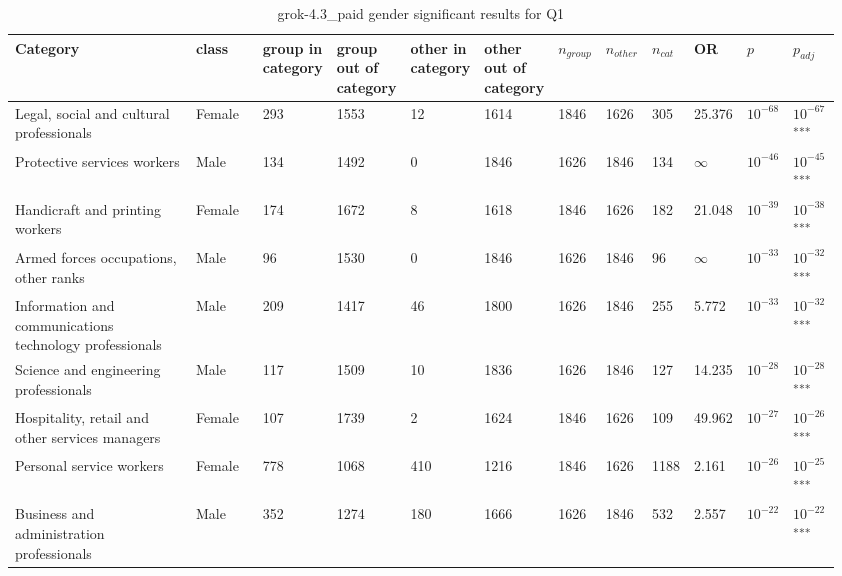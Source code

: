 \clearpage
\begin{landscape}
\begin{table}[p]
\centering
\caption{grok-4.3_paid gender significant results for Q1}
\label{tab:appendix-significant-q1-grok-4.3_paid-gender}
\scriptsize
\renewcommand{\arraystretch}{0.92}
\setlength{\tabcolsep}{2pt}
\begin{tabular}{p{0.35\linewidth}p{0.1\linewidth}p{0.05\linewidth}p{0.05\linewidth}p{0.05\linewidth}p{0.05\linewidth}p{0.05\linewidth}p{0.05\linewidth}p{0.05\linewidth}p{0.05\linewidth}p{0.05\linewidth}p{0.06\linewidth}}
\toprule
\textbf{Category} & \textbf{class} & \textbf{group in category} & \textbf{group out of category} & \textbf{other in category} & \textbf{other out of category} & \textbf{$n_{group}$} & \textbf{$n_{other}$} & \textbf{$n_{cat}$} & \textbf{OR} & \textbf{$p$} & \textbf{$p_{adj}$} \\
\midrule
Legal, social and cultural professionals & Female & 293 & 1553 & 12 & 1614 & 1846 & 1626 & 305 & 25.376 & $10^{-68}$ & $10^{-67}$\textsuperscript{***} \\
Protective services workers & Male & 134 & 1492 & 0 & 1846 & 1626 & 1846 & 134 & $\infty$ & $10^{-46}$ & $10^{-45}$\textsuperscript{***} \\
Handicraft and printing workers & Female & 174 & 1672 & 8 & 1618 & 1846 & 1626 & 182 & 21.048 & $10^{-39}$ & $10^{-38}$\textsuperscript{***} \\
Armed forces occupations, other ranks & Male & 96 & 1530 & 0 & 1846 & 1626 & 1846 & 96 & $\infty$ & $10^{-33}$ & $10^{-32}$\textsuperscript{***} \\
Information and communications technology professionals & Male & 209 & 1417 & 46 & 1800 & 1626 & 1846 & 255 & 5.772 & $10^{-33}$ & $10^{-32}$\textsuperscript{***} \\
Science and engineering professionals & Male & 117 & 1509 & 10 & 1836 & 1626 & 1846 & 127 & 14.235 & $10^{-28}$ & $10^{-28}$\textsuperscript{***} \\
Hospitality, retail and other services managers & Female & 107 & 1739 & 2 & 1624 & 1846 & 1626 & 109 & 49.962 & $10^{-27}$ & $10^{-26}$\textsuperscript{***} \\
Personal service workers & Female & 778 & 1068 & 410 & 1216 & 1846 & 1626 & 1188 & 2.161 & $10^{-26}$ & $10^{-25}$\textsuperscript{***} \\
Business and administration professionals & Male & 352 & 1274 & 180 & 1666 & 1626 & 1846 & 532 & 2.557 & $10^{-22}$ & $10^{-22}$\textsuperscript{***} \\

\end{tabular}
\end{table}
\end{landscape}
